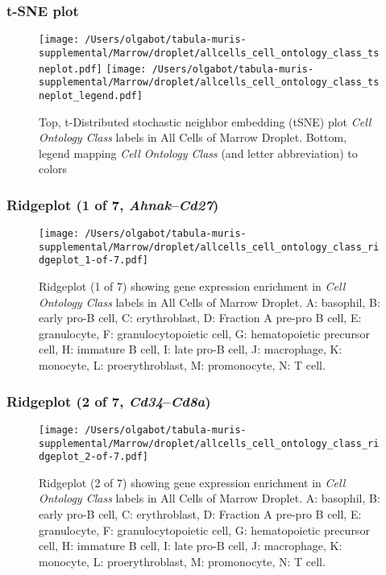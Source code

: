 \clearpage
\subsubsection{t-SNE plot}
\begin{figure}[h]
\centering
\texttt{[image: /Users/olgabot/tabula-muris-supplemental/Marrow/droplet/allcells\_cell\_ontology\_class\_tsneplot.pdf]}
\texttt{[image: /Users/olgabot/tabula-muris-supplemental/Marrow/droplet/allcells\_cell\_ontology\_class\_tsneplot\_legend.pdf]}
\caption{Top, t-Distributed stochastic neighbor embedding (tSNE) plot  \emph{Cell Ontology Class} labels in All Cells of Marrow Droplet. Bottom, legend mapping \emph{Cell Ontology Class} (and letter abbreviation) to colors}
\end{figure}


\clearpage

\subsubsection{Ridgeplot (1 of 7, \emph{Ahnak}--\emph{Cd27})}
\begin{figure}[h]
\centering
\texttt{[image: /Users/olgabot/tabula-muris-supplemental/Marrow/droplet/allcells\_cell\_ontology\_class\_ridgeplot\_1-of-7.pdf]}

\caption{ Ridgeplot (1 of 7)  showing gene expression enrichment in \emph{Cell Ontology Class} labels in All Cells of Marrow Droplet. A: basophil, B: early pro-B cell, C: erythroblast, D: Fraction A pre-pro B cell, E: granulocyte, F: granulocytopoietic cell, G: hematopoietic precursor cell, H: immature B cell, I: late pro-B cell, J: macrophage, K: monocyte, L: proerythroblast, M: promonocyte, N: T cell.}
\end{figure}


\clearpage

\subsubsection{Ridgeplot (2 of 7, \emph{Cd34}--\emph{Cd8a})}
\begin{figure}[h]
\centering
\texttt{[image: /Users/olgabot/tabula-muris-supplemental/Marrow/droplet/allcells\_cell\_ontology\_class\_ridgeplot\_2-of-7.pdf]}

\caption{ Ridgeplot (2 of 7)  showing gene expression enrichment in \emph{Cell Ontology Class} labels in All Cells of Marrow Droplet. A: basophil, B: early pro-B cell, C: erythroblast, D: Fraction A pre-pro B cell, E: granulocyte, F: granulocytopoietic cell, G: hematopoietic precursor cell, H: immature B cell, I: late pro-B cell, J: macrophage, K: monocyte, L: proerythroblast, M: promonocyte, N: T cell.}
\end{figure}


